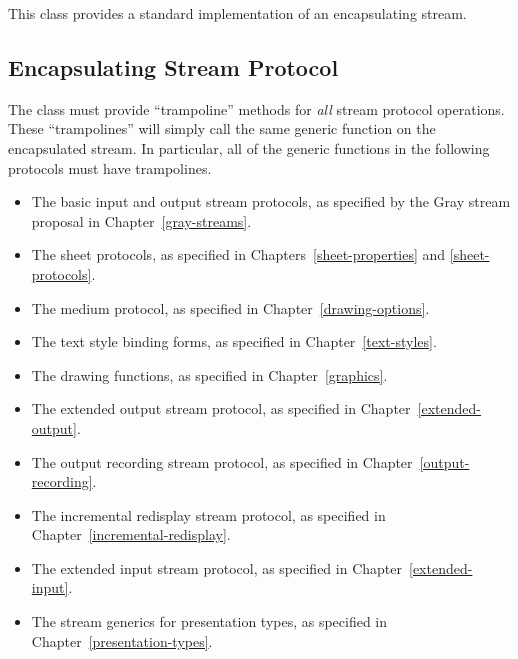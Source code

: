 
This class provides a standard implementation of an encapsulating stream.


\subsection {Encapsulating Stream Protocol}

The  class must provide ``trampoline'' methods
for {\sl all} stream protocol operations.  These ``trampolines'' will simply
call the same generic function on the encapsulated stream.  In particular, all
of the generic functions in the following protocols must have trampolines.

\begin{itemize}
\item The basic input and output stream protocols, as specified by the Gray
stream proposal in Chapter~\ref{gray-streams}.

\item The sheet protocols, as specified in Chapters~\ref{sheet-properties} and
\ref{sheet-protocols}.

\item The medium protocol, as specified in Chapter~\ref{drawing-options}.

\item The text style binding forms, as specified in Chapter~\ref{text-styles}.

\item The drawing functions, as specified in Chapter~\ref{graphics}.

\item The extended output stream protocol, as specified in
Chapter~\ref{extended-output}.

\item The output recording stream protocol, as specified in
Chapter~\ref{output-recording}.

\item The incremental redisplay stream protocol, as specified in
Chapter~\ref{incremental-redisplay}.

\item The extended input stream protocol, as specified in
Chapter~\ref{extended-input}.

\item The stream generics for presentation types, as specified in
Chapter~\ref{presentation-types}.
\end{itemize}

